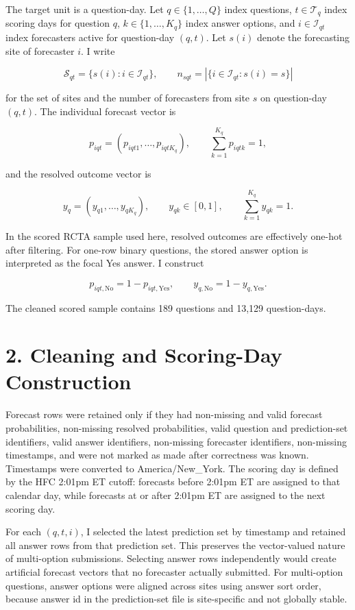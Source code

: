 \documentclass[
]{article}
\begin{document}
The target unit is a question-day. Let \(q \in \{1,\ldots,Q\}\) index
questions, \(t \in \mathcal{T}_q\) index scoring days for question
\(q\), \(k \in \{1,\ldots,K_q\}\) index answer options, and
\(i \in \mathcal{I}_{qt}\) index forecasters active for question-day
\((q,t)\). Let \(s(i)\) denote the forecasting site of forecaster \(i\).
I write

\[
\mathcal{S}_{qt}=\{s(i): i\in\mathcal{I}_{qt}\}, \qquad
n_{sqt}=|\{i\in\mathcal{I}_{qt}:s(i)=s\}|
\]

for the set of sites and the number of forecasters from site \(s\) on
question-day \((q,t)\). The individual forecast vector is

\[
p_{iqt} = (p_{iqt1},\ldots,p_{iqtK_q}), \qquad \sum_{k=1}^{K_q}p_{iqtk}=1,
\]

and the resolved outcome vector is

\[
y_q = (y_{q1},\ldots,y_{qK_q}), \qquad y_{qk}\in[0,1], \qquad \sum_{k=1}^{K_q}y_{qk}=1.
\]

In the scored RCTA sample used here, resolved outcomes are effectively
one-hot after filtering. For one-row binary questions, the stored answer
option is interpreted as the focal Yes answer. I construct

\[
p_{iqt,\mathrm{No}} = 1-p_{iqt,\mathrm{Yes}}, \qquad
y_{q,\mathrm{No}} = 1-y_{q,\mathrm{Yes}}.
\]

The cleaned scored sample contains 189 questions and 13,129
question-days.

\section{2. Cleaning and Scoring-Day
Construction}\label{cleaning-and-scoring-day-construction}

Forecast rows were retained only if they had non-missing and valid
forecast probabilities, non-missing resolved probabilities, valid
question and prediction-set identifiers, valid answer identifiers,
non-missing forecaster identifiers, non-missing timestamps, and were not
marked as made after correctness was known. Timestamps were converted to
America/New\_York. The scoring day is defined by the HFC 2:01pm ET
cutoff: forecasts before 2:01pm ET are assigned to that calendar day,
while forecasts at or after 2:01pm ET are assigned to the next scoring
day.

For each \((q,t,i)\), I selected the latest prediction set by timestamp
and retained all answer rows from that prediction set. This preserves
the vector-valued nature of multi-option submissions. Selecting answer
rows independently would create artificial forecast vectors that no
forecaster actually submitted. For multi-option questions, answer
options were aligned across sites using answer sort order, because
answer id in the prediction-set file is site-specific and not globally
stable.
\end{document}
